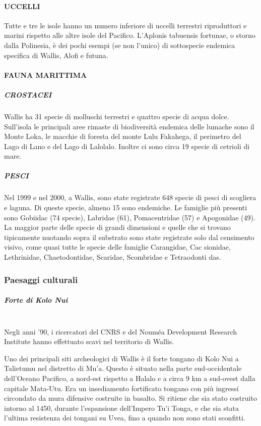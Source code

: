 \documentclass[fleqn,11pt]{SelfArx} %
\begin{document}
\paragraph{UCCELLI}
Tutte e tre le isole hanno un numero inferiore di uccelli terrestri riproduttori e marini rispetto alle altre isole del Pacifico.
L'Aplonis tabuensis fortunae, o storno dalla Polinesia, è dei pochi esempi (se non l'unico) di sottospecie endemica specifica di Wallis, Alofi e futuna.

\paragraph{FAUNA MARITTIMA}
\subparagraph{CROSTACEI}
Wallis ha 31 specie di molluschi terrestri e quattro specie di acqua dolce.
Sull'isola le principali aree rimaste di biodiversità endemica delle lumache sono il Monte Loka, le macchie di foresta del monte Lulu Fakahega, il perimetro del Lago di Lano e del Lago di Lalolalo.
Inoltre ci sono circa 19 specie di cetrioli di mare.

\subparagraph{PESCI}
Nel 1999 e nel 2000, a Wallis, sono state registrate 648 specie di pesci di scogliera e laguna. Di queste specie, almeno 15 sono endemiche.
Le famiglie più presenti sono Gobiidac (74 specie), Labridae (61), Pomacentridae (57) e Apogonidae (49).
La maggior parte delle specie di grandi dimensioni e quelle che si trovano tipicamente nuotando sopra il substrato sono state registrate solo dal censimento visivo, come quasi tutte le specie delle famiglie Carangidae, Cac sionidae, Lethrinidae, Chaetodontidae, Scaridae, Scombridae e Tetraodonti das.

\subsubsection{Paesaggi culturali}
\subparagraph{Forte di Kolo Nui} \phantom{a}\\
Negli anni '90, i ricercatori del CNRS e del Nouméa Development Research Institute hanno effettuato scavi nel territorio di Wallis.

Uno dei principali siti archeologici di Wallis è il forte tongano di Kolo Nui a Talietumu nel distretto di Mu'a.
Questo è situato nella parte sud-occidentale dell'Oceano Pacifico, a nord-est rispetto a Halalo e a circa 9 km a sud-ovest dalla capitale Mata-Utu. 
Era un insediamento fortificato tongano con più ingressi circondato da mura difensive costruite in basalto.
Si ritiene che sia stato costruito intorno al 1450, durante l'espansione dell'Impero Tu'i Tonga, e che sia stata l'ultima resistenza dei tongani su Uvea, fino a quando non sono stati sconfitti.
\end{document}
